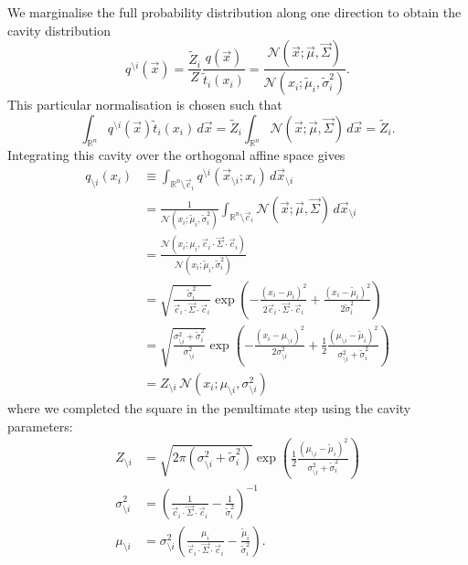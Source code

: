 \documentclass[11pt,twoside]{report}
\begin{document}
We marginalise the full probability distribution along one direction to obtain the cavity distribution
\begin{equation}
  q^{\setminus i}(\vec{x}) =
  \frac{\tilde{Z}_i}{Z} \frac{q(\vec{x})}{\tilde{t}_i(x_i)}
  =
  \frac
      {\mathcal{N}(\vec{x}; \vec{\mu}, \vec{\Sigma})}
      {\mathcal{N}(x_i; \tilde{\mu}_i, \tilde{\sigma}_i^2)}.
\end{equation}
This particular normalisation is chosen such that
\begin{equation}\label{eq:approximate-zeroth-moment}
  \int_{\mathbb{R}^n} q^{\setminus i}(\vec{x}) \tilde{t}_i(x_i) \, d\vec{x} =
  \tilde{Z}_i \int_{\mathbb{R}^n} \mathcal{N}(\vec{x}; \vec{\mu}, \vec{\Sigma}) \, d\vec{x} =
  \tilde{Z}_i.
\end{equation}
Integrating this cavity over the orthogonal affine space gives
\begin{equation}
  \begin{split}
    q_{\setminus i}(x_i) &\equiv
    \int_{\mathbb{R}^n \setminus \vec{c}_i} q^{\setminus i} (\vec{x}_{\setminus i}; x_i) \, d\vec{x}_{\setminus i} \\
    &= \frac{1}{\mathcal{N}(x_i; \tilde{\mu}_i, \tilde{\sigma}_i^2)}
    \int_{\mathbb{R}^n \setminus \vec{c}_i} \mathcal{N}(\vec{x}; \vec{\mu}, \vec{\Sigma}) \, d\vec{x}_{\setminus i} \\
    &=
    \frac
        {\mathcal{N}(x_i; \mu_i, \vec{c}_i \cdot \vec{\Sigma} \cdot \vec{c}_i)}
        {\mathcal{N}(x_i; \tilde{\mu}_i, \tilde{\sigma}_i^2)} \\
    &=
        \sqrt{ \frac{\tilde{\sigma}_i^2}{\vec{c}_i \cdot \vec{\Sigma} \cdot \vec{c}_i} }
        \exp{\left( -\frac{(x_i - \mu_i)^2}{2 \vec{c}_i \cdot \vec{\Sigma} \cdot \vec{c}_i} +
          \frac{(x_i - \tilde{\mu}_i)^2}{2 \tilde{\sigma}_i^2} \right)} \\
    &=
        \sqrt{ \frac{\sigma_{\setminus i}^2 + \tilde{\sigma}_i^2}{\sigma_{\setminus i}^2} }
        \exp{\left(
          - \frac{(x_i - \mu_{\setminus i})^2}{2 \sigma_{\setminus i}^2}
          + \frac{1}{2}
          \frac{(\mu_{\setminus i} - \tilde{\mu}_i)^2}{\sigma_{\setminus i}^2 + \tilde{\sigma}_i^2}
          \right)} \\
     &= Z_{\setminus i} \, \mathcal{N}(x_i; \mu_{\setminus i}, \sigma_{\setminus i}^2)
  \end{split}
\end{equation}
where we completed the square in the penultimate step using the cavity parameters:
\begin{align}
  Z_{\setminus i}
  &=
  \sqrt{2 \pi (\sigma_{\setminus i}^2 + \tilde{\sigma}_i^2)}
  \exp{\left(
    \frac{1}{2}
    \frac{(\mu_{\setminus i} - \tilde{\mu}_i)^2}{\sigma_{\setminus i}^2 + \tilde{\sigma}_i^2}
    \right)}
        \\
  \sigma_{\setminus i}^2 &= \left(
  \frac{1}{\vec{c}_i \cdot \vec{\Sigma} \cdot \vec{c}_i} - \frac{1}{\tilde{\sigma}_i^2}
  \right)^{-1} \\
  \mu_{\setminus i} &= \sigma_{\setminus i}^2 \left(
  \frac{\mu_i}{\vec{c}_i \cdot \vec{\Sigma} \cdot \vec{c}_i} - \frac{\tilde{\mu}_i}{\tilde{\sigma}_i^2}
  \right).
\end{align}
\end{document}
